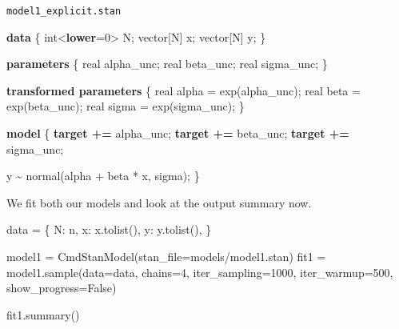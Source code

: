 \documentclass[
  letterpaper,
  DIV=11,
  numbers=noendperiod]{scrartcl}
\newenvironment{Shaded}{\begin{snugshade}}{\end{snugshade}}
\newcommand{\DataTypeTok}[1]{\textcolor[rgb]{0.68,0.00,0.00}{#1}}
\newcommand{\DecValTok}[1]{\textcolor[rgb]{0.68,0.00,0.00}{#1}}
\newcommand{\KeywordTok}[1]{\textcolor[rgb]{0.00,0.23,0.31}{\textbf{#1}}}
\newcommand{\NormalTok}[1]{\textcolor[rgb]{0.00,0.23,0.31}{#1}}
\newcommand{\OperatorTok}[1]{\textcolor[rgb]{0.37,0.37,0.37}{#1}}
\newcommand{\StringTok}[1]{\textcolor[rgb]{0.13,0.47,0.30}{#1}}
\newcommand{\VariableTok}[1]{\textcolor[rgb]{0.07,0.07,0.07}{#1}}
\begin{document}
\begin{codelisting}

\caption{\texttt{model1\_explicit.stan}}

\begin{Shaded}
\begin{Highlighting}[]
\KeywordTok{data}\NormalTok{ \{}
    \DataTypeTok{int}\NormalTok{\textless{}}\KeywordTok{lower}\NormalTok{=}\DecValTok{0}\NormalTok{\textgreater{} N;}
    \DataTypeTok{vector}\NormalTok{[N] x;}
    \DataTypeTok{vector}\NormalTok{[N] y;}
\NormalTok{\}}

\KeywordTok{parameters}\NormalTok{ \{}
    \DataTypeTok{real}\NormalTok{ alpha\_unc; }
    \DataTypeTok{real}\NormalTok{ beta\_unc;}
    \DataTypeTok{real}\NormalTok{ sigma\_unc;}
\NormalTok{\}}

\KeywordTok{transformed parameters}\NormalTok{ \{}
    \DataTypeTok{real}\NormalTok{ alpha = exp(alpha\_unc); }
    \DataTypeTok{real}\NormalTok{ beta = exp(beta\_unc);   }
    \DataTypeTok{real}\NormalTok{ sigma = exp(sigma\_unc); }
\NormalTok{\}}

\KeywordTok{model}\NormalTok{ \{}
    \KeywordTok{target +=}\NormalTok{ alpha\_unc;  }
    \KeywordTok{target +=}\NormalTok{ beta\_unc;  }
    \KeywordTok{target +=}\NormalTok{ sigma\_unc;  }
    
\NormalTok{    y \textasciitilde{} normal(alpha + beta * x, sigma);}
\NormalTok{\}}
\end{Highlighting}
\end{Shaded}

\end{codelisting}

We fit both our models and look at the output summary now.

\begin{Shaded}
\begin{Highlighting}[]
\NormalTok{data }\OperatorTok{=}\NormalTok{ \{}
    \StringTok{\textquotesingle{}N\textquotesingle{}}\NormalTok{: n,}
    \StringTok{\textquotesingle{}x\textquotesingle{}}\NormalTok{: x.tolist(),}
    \StringTok{\textquotesingle{}y\textquotesingle{}}\NormalTok{: y.tolist(),}
\NormalTok{\}}
\end{Highlighting}
\end{Shaded}

\begin{Shaded}
\begin{Highlighting}[]
\NormalTok{model1 }\OperatorTok{=}\NormalTok{ CmdStanModel(stan\_file}\OperatorTok{=}\StringTok{\textquotesingle{}models/model1.stan\textquotesingle{}}\NormalTok{)}
\NormalTok{fit1 }\OperatorTok{=}\NormalTok{ model1.sample(data}\OperatorTok{=}\NormalTok{data, chains}\OperatorTok{=}\DecValTok{4}\NormalTok{, iter\_sampling}\OperatorTok{=}\DecValTok{1000}\NormalTok{, iter\_warmup}\OperatorTok{=}\DecValTok{500}\NormalTok{, show\_progress}\OperatorTok{=}\VariableTok{False}\NormalTok{)}

\NormalTok{fit1.summary()}
\end{Highlighting}
\end{Shaded}
\end{document}
